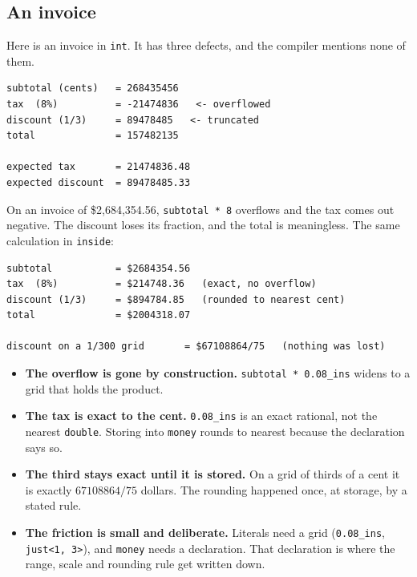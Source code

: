 \documentclass[11pt,a4paper]{article}
\newcommand{\code}[1]{\texttt{\small #1}}
\begin{document}
\subsection{An invoice}

Here is an invoice in \code{int}. It has three defects, and the compiler
mentions none of them.


\begin{lstlisting}[style=term]
subtotal (cents)   = 268435456
tax  (8%)          = -21474836   <- overflowed
discount (1/3)     = 89478485   <- truncated
total              = 157482135

expected tax       = 21474836.48
expected discount  = 89478485.33
\end{lstlisting}

\noindent
On an invoice of \$2,684,354.56, \code{subtotal * 8} overflows and the tax
comes out negative. The discount loses its fraction, and the total is
meaningless. The same calculation in \code{inside}:


\begin{lstlisting}[style=term]
subtotal           = $2684354.56
tax  (8%)          = $214748.36   (exact, no overflow)
discount (1/3)     = $894784.85   (rounded to nearest cent)
total              = $2004318.07

discount on a 1/300 grid       = $67108864/75   (nothing was lost)
\end{lstlisting}

\begin{itemize}
\item \textbf{The overflow is gone by construction.} \code{subtotal * 0.08\_ins}
      widens to a grid that holds the product.
\item \textbf{The tax is exact to the cent.} \code{0.08\_ins} is an exact
      rational, not the nearest \code{double}. Storing into \code{money} rounds
      to nearest because the declaration says so.
\item \textbf{The third stays exact until it is stored.} On a grid of
      thirds of a cent it is exactly $67108864/75$ dollars. The rounding
      happened once, at storage, by a stated rule.
\item \textbf{The friction is small and deliberate.} Literals need a grid
      (\code{0.08\_ins}, \code{just<1, 3>}), and \code{money} needs a
      declaration. That declaration is where the range, scale and rounding rule
      get written down.
\end{itemize}
\end{document}

